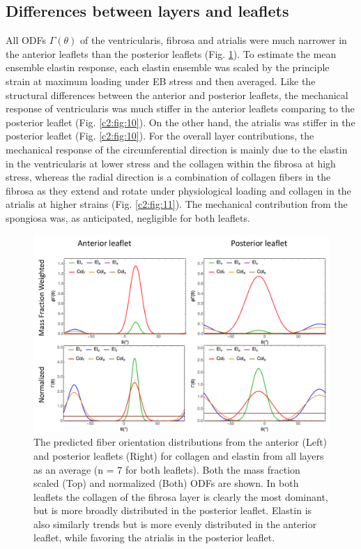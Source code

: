 \subsection{Differences between layers and leaflets}

    All ODFs $\Gamma(\theta)$ of the ventricularis, fibrosa and atrialis were much narrower in the anterior leaflets than the posterior leaflets (Fig. \ref{c2:fig:9}). To estimate the mean ensemble elastin response, each elastin ensemble was scaled by the principle strain at maximum loading under EB stress and then averaged. Like the structural differences between the anterior and posterior leaflets, the mechanical response of ventricularis was much stiffer in the anterior leaflets comparing to the posterior leaflet (Fig. \ref{c2:fig:10}). On the other hand, the atrialis was stiffer in the posterior leaflet (Fig. \ref{c2:fig:10}). For the overall layer contributions, the mechanical response of the circumferential direction is mainly due to the elastin in the ventricularis at lower stress and the collagen within the fibrosa at high stress, whereas the radial direction is a combination of collagen fibers in the fibrosa as they extend and rotate under physiological loading and collagen in the atrialis at higher strains (Fig. \ref{c2:fig:11}). The mechanical contribution from the spongiosa was, as anticipated, negligible for both leaflets.
    
    
\begin{figure}
\centering
\includegraphics[width=\textwidth]{Images/chapter2/figure9.pdf}
\caption{The predicted fiber orientation distributions from the anterior (Left) and posterior leaflets (Right) for collagen and elastin from all layers as an average (n = 7 for both leaflets). Both the mass fraction scaled (Top) and normalized (Both) ODFs are shown. In both leaflets the collagen of the fibrosa layer is clearly the most dominant, but is more broadly distributed in the posterior leaflet. Elastin is also similarly trends but is more evenly distributed in the anterior leaflet, while favoring the atrialis in the posterior leaflet.}
\label{c2:fig:9}
\end{figure}


